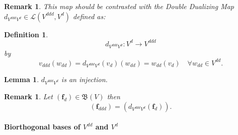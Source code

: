 \documentclass[aps,preprint]{revtex4}
\newtheorem{definition}[theorem]{Definition}
\newtheorem{lemma}[theorem]{Lemma}
\newtheorem{remark}[theorem]{Remark}
\begin{document}
\begin{remark}
This map should be contrasted with the \emph{Double Dualizing Map} $%
d_{V^{ddd}V^{d}}\in \mathcal{L}\left( V^{ddd},V^{d}\right) $ defined as:
\end{remark}

\begin{definition}
\begin{equation}
d_{V^{ddd}V^{d}}:V^{d}\rightarrow V^{ddd}
\end{equation}%
by 
\begin{equation}
v_{ddd}\left( w_{dd}\right) =d_{V^{ddd}V^{d}}\left( v_{d}\right) \left(
w_{dd}\right) =w_{dd}\left( v_{d}\right) \quad \forall w_{dd}\in V^{dd}.
\end{equation}
\end{definition}

\begin{lemma}
$d_{V^{ddd}V^{d}}$ is an injection.
\end{lemma}

\begin{remark}
Let $\left( \boldsymbol{f}_{d}\right) \in \mathfrak{B}\left( V\right) $ then 
\begin{equation}
\left( \boldsymbol{f}_{ddd}\right) =\left( \overset{}{d_{V^{ddd}V^{d}}\left( 
\boldsymbol{f}_{d}\right) }\right) .
\end{equation}
\end{remark}

\paragraph{Biorthogonal bases of $V^{dd}$ and $V^{d}$ \label{Biorthogonal
basis of the dual and double dual}}
\end{document}
